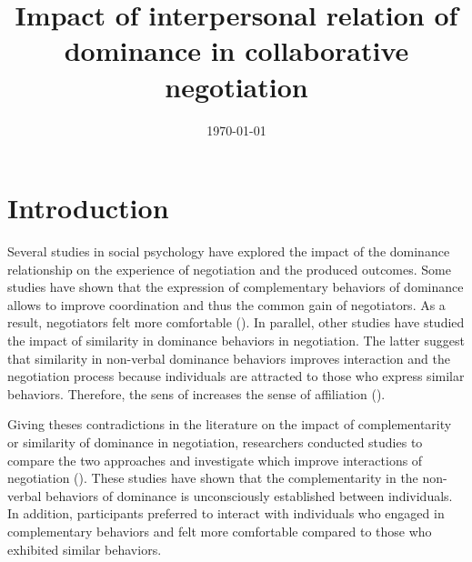 \documentclass[10pt, a4paper, twocolumn]{article} %
\title{Impact of interpersonal relation of dominance in collaborative negotiation} %
\date{\today} %
\begin{document}
\maketitle %

\thispagestyle{firstpage} %




\section{Introduction}


	Several studies in social psychology have explored the impact of the dominance relationship on the experience of negotiation and the produced outcomes. Some studies have shown that the expression of complementary behaviors of dominance allows to improve coordination and thus the common gain of negotiators. As a result, negotiators felt more comfortable (\cite{tiedens2003power,wiltermuth2009benefits,olekalns2013dyadic}). 
	In parallel, other studies have studied the impact of similarity in dominance behaviors in negotiation. The latter suggest that similarity in non-verbal dominance behaviors improves interaction and the negotiation process because individuals are attracted to those who express similar behaviors. Therefore, the sens of increases the sense of affiliation (\emph{\cite{olekalns2013dyadic}}).
	
	Giving theses contradictions in the literature on the impact of complementarity or similarity of dominance in negotiation, researchers conducted studies to compare the two approaches and investigate which improve interactions of negotiation (\cite{tiedens2003power,dryer1997opposites}). These studies have shown that the complementarity in the non-verbal behaviors of dominance is unconsciously established between individuals. In addition, participants preferred to interact with individuals who engaged in complementary behaviors and felt more comfortable compared to those who exhibited similar behaviors.
	
\end{document}

